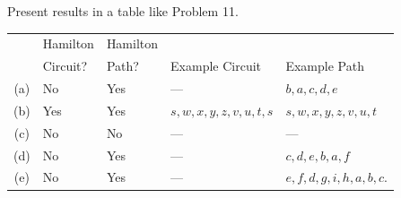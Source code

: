 \begin{questions}
Present results in a table like Problem 11. 

    \ifprintanswers
        \vspace{-10pt}
   \fi
    \begin{solution}
        \begin{tabular}{|c|ll|ll|}
        \hline 
              & Hamilton & Hamilton &  & \\
              & Circuit? & Path? & Example Circuit & Example Path \\
        \hline 
            (a) & No & Yes & ---  & $b, a, c, d, e$ \\
        \hline 
            (b) & Yes & Yes & $s, w, x, y, z, v, u, t, s$ & $s, w, x, y, z, v, u, t$ \\
        \hline 
            (c) & No & No & ---  & --- \\
        \hline 
            (d) & No & Yes & --- & $c, d, e, b, a, f$ \\
        \hline
            (e) & No  & Yes  & --- &  $e, f, d, g, i, h, a, b, c$. \\
        \hline 
        \end{tabular} 


    \end{solution}





\end{questions}
